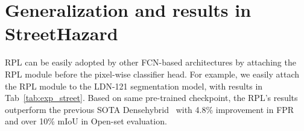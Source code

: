 \documentclass[10pt,twocolumn,letterpaper]{article}
\begin{document}
\begin{table}[t!]
\caption{Results on StreetHazards w/ LDN-121 net based on the closed-set checkpoint and evaluation code on {\small \url{https://github.com/matejgrcic/DenseHybrid}}. The Closed/Open sets are measured by mean IoU and we use \textit{energy} to compute anomaly score.  denotes the results from pretrained inlier model for both our approach and~\cite{grcic2022densehybrid}.}
\vspace{-3pt}
\label{tab:exp_street}
\vspace{-10pt}
\end{table}

\section{Generalization and results in StreetHazard} \vspace{-3pt}
RPL can be easily adopted by other FCN-based architectures by attaching the RPL module before the pixel-wise classifier head. 
For example, we easily attach the RPL module to the LDN-121 segmentation model, with results in Tab~\cref{tab:exp_street}. Based on same pre-trained checkpoint, the RPL's results outperform the previous SOTA Densehybrid~\cite{grcic2022densehybrid} with 4.8\% improvement in FPR and over 10\% mIoU in Open-set evaluation.
\end{document}
